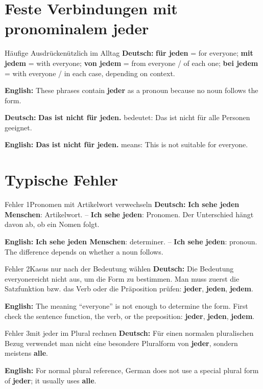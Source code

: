 \documentclass[a4paper,11pt]{article}
\newcommand{\GermanText}[1]{\textbf{Deutsch: }#1\par}
\newcommand{\EnglishText}[1]{{\small\color{SoftGray}\textbf{English: }#1\par}}
\begin{document}
\section{Feste Verbindungen mit pronominalem jeder}
\begin{grammarentry}{Häufige Ausdrücke}{nützlich im Alltag}
\GermanText{\textbf{für jeden} = for everyone; \textbf{mit jedem} = with everyone; \textbf{von jedem} = from everyone / of each one; \textbf{bei jedem} = with everyone / in each case, depending on context.}
\EnglishText{These phrases contain \textbf{jeder} as a pronoun because no noun follows the form.}
\GermanText{\textbf{Das ist nicht für jeden.} bedeutet: Das ist nicht für alle Personen geeignet.}
\EnglishText{\textbf{Das ist nicht für jeden.} means: This is not suitable for everyone.}
\end{grammarentry}

\section{Typische Fehler}
\begin{grammarentry}{Fehler 1}{Pronomen mit Artikelwort verwechseln}
\GermanText{\textbf{Ich sehe jeden Menschen}: Artikelwort. -- \textbf{Ich sehe jeden}: Pronomen. Der Unterschied hängt davon ab, ob ein Nomen folgt.}
\EnglishText{\textbf{Ich sehe jeden Menschen}: determiner. -- \textbf{Ich sehe jeden}: pronoun. The difference depends on whether a noun follows.}
\end{grammarentry}

\begin{grammarentry}{Fehler 2}{Kasus nur nach der Bedeutung wählen}
\GermanText{Die Bedeutung \glqq everyone\grqq reicht nicht aus, um die Form zu bestimmen. Man muss zuerst die Satzfunktion bzw. das Verb oder die Präposition prüfen: \textbf{jeder}, \textbf{jeden}, \textbf{jedem}.}
\EnglishText{The meaning ``everyone'' is not enough to determine the form. First check the sentence function, the verb, or the preposition: \textbf{jeder}, \textbf{jeden}, \textbf{jedem}.}
\end{grammarentry}

\begin{grammarentry}{Fehler 3}{mit jeder im Plural rechnen}
\GermanText{Für einen normalen pluralischen Bezug verwendet man nicht eine besondere Pluralform von \textbf{jeder}, sondern meistens \textbf{alle}.}
\EnglishText{For normal plural reference, German does not use a special plural form of \textbf{jeder}; it usually uses \textbf{alle}.}
\end{grammarentry}
\end{document}
